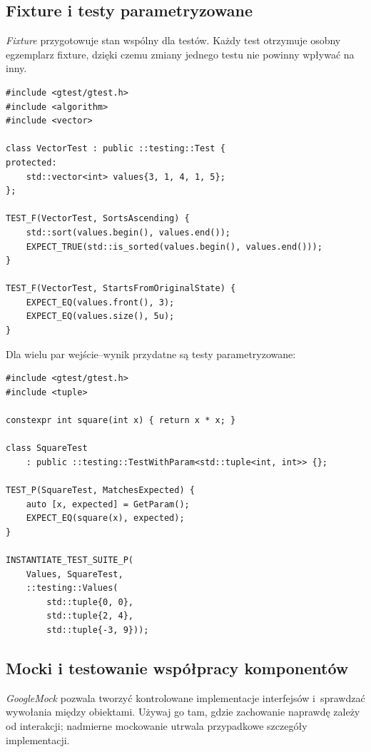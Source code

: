 \subsection{Fixture i testy parametryzowane}

\emph{Fixture} przygotowuje stan wspólny dla testów. Każdy test
 otrzymuje osobny egzemplarz fixture, dzięki czemu zmiany
jednego testu nie powinny wpływać na inny.

\begin{lstlisting}[caption={Fixture z przygotowanym wektorem.}]
#include <gtest/gtest.h>
#include <algorithm>
#include <vector>

class VectorTest : public ::testing::Test {
protected:
    std::vector<int> values{3, 1, 4, 1, 5};
};

TEST_F(VectorTest, SortsAscending) {
    std::sort(values.begin(), values.end());
    EXPECT_TRUE(std::is_sorted(values.begin(), values.end()));
}

TEST_F(VectorTest, StartsFromOriginalState) {
    EXPECT_EQ(values.front(), 3);
    EXPECT_EQ(values.size(), 5u);
}
\end{lstlisting}

Dla wielu par wejście--wynik przydatne są testy parametryzowane:

\begin{lstlisting}[caption={GoogleTest: test parametryzowany z zestawem wartosci.}]
#include <gtest/gtest.h>
#include <tuple>

constexpr int square(int x) { return x * x; }

class SquareTest
    : public ::testing::TestWithParam<std::tuple<int, int>> {};

TEST_P(SquareTest, MatchesExpected) {
    auto [x, expected] = GetParam();
    EXPECT_EQ(square(x), expected);
}

INSTANTIATE_TEST_SUITE_P(
    Values, SquareTest,
    ::testing::Values(
        std::tuple{0, 0},
        std::tuple{2, 4},
        std::tuple{-3, 9}));
\end{lstlisting}

\subsection{Mocki i testowanie współpracy komponentów}

\emph{GoogleMock} pozwala tworzyć kontrolowane implementacje
interfejsów i~sprawdzać wywołania między obiektami. Używaj go tam,
gdzie zachowanie naprawdę zależy od interakcji; nadmierne mockowanie
utrwala przypadkowe szczegóły implementacji.

